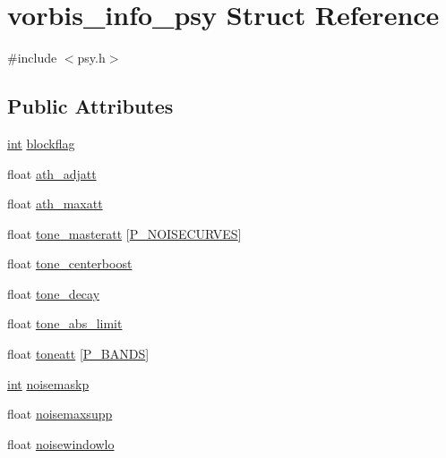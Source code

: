 \hypertarget{structvorbis__info__psy}{}\section{vorbis\+\_\+info\+\_\+psy Struct Reference}
\label{structvorbis__info__psy}


{\ttfamily \#include $<$psy.\+h$>$}

\subsection*{Public Attributes}
\begin{DoxyCompactItemize}
\item 
\hyperlink{xmltok_8h_a5a0d4a5641ce434f1d23533f2b2e6653}{int} \hyperlink{structvorbis__info__psy_a884dea13b7446c8f28f40d5ae3faa144}{blockflag}
\item 
float \hyperlink{structvorbis__info__psy_a299a4a5373e48f994fee99cc701299e7}{ath\+\_\+adjatt}
\item 
float \hyperlink{structvorbis__info__psy_a59d8b44072c5de4de4a7a79b30cf0595}{ath\+\_\+maxatt}
\item 
float \hyperlink{structvorbis__info__psy_a254bb09eb0de3cf794063ad1102b7a8c}{tone\+\_\+masteratt} \mbox{[}\hyperlink{psy_8h_a179ea3e4fa2cdb1ef235e922ea51405a}{P\+\_\+\+N\+O\+I\+S\+E\+C\+U\+R\+V\+ES}\mbox{]}
\item 
float \hyperlink{structvorbis__info__psy_acc3f82d8c41c63e6e35d2cb451d72069}{tone\+\_\+centerboost}
\item 
float \hyperlink{structvorbis__info__psy_ac10d4f96b564c11d017a2403f23914d9}{tone\+\_\+decay}
\item 
float \hyperlink{structvorbis__info__psy_adea96fad862c5291d520454d6a029876}{tone\+\_\+abs\+\_\+limit}
\item 
float \hyperlink{structvorbis__info__psy_ab8ef339e8d8ae469c1ae7ba706534a91}{toneatt} \mbox{[}\hyperlink{psy_8h_ae6af2ec0a0f6e0813ae814e9a07c728a}{P\+\_\+\+B\+A\+N\+DS}\mbox{]}
\item 
\hyperlink{xmltok_8h_a5a0d4a5641ce434f1d23533f2b2e6653}{int} \hyperlink{structvorbis__info__psy_ac7d88922bbd445f3688f1b58a835afb3}{noisemaskp}
\item 
float \hyperlink{structvorbis__info__psy_ad102882d97e34592a277c60ac6636056}{noisemaxsupp}
\item 
float \hyperlink{structvorbis__info__psy_a6cfe41252db68bd2f1bb408119673b3a}{noisewindowlo}
\item 

\end{DoxyCompactItemize}
